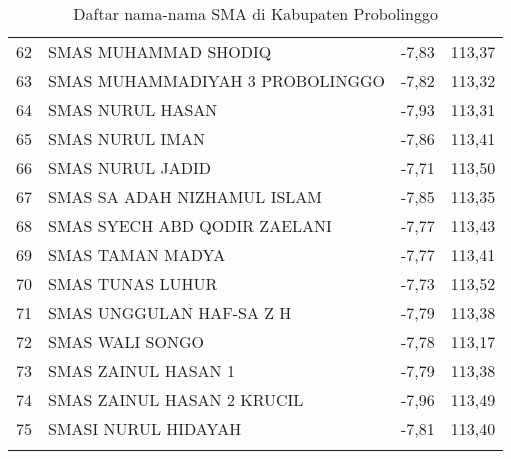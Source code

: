 {\begin{longtable}[c]{clll}
62 & SMAS   MUHAMMAD SHODIQ                & -7,83 & 113,37 \\
\rowcolor[HTML]{D9E1F2} 
63 & SMAS MUHAMMADIYAH 3 PROBOLINGGO       & -7,82 & 113,32 \\
64 & SMAS   NURUL HASAN                    & -7,93 & 113,31 \\
\rowcolor[HTML]{D9E1F2} 
65 & SMAS NURUL IMAN                       & -7,86 & 113,41 \\
66 & SMAS   NURUL JADID                    & -7,71 & 113,50 \\
\rowcolor[HTML]{D9E1F2} 
67 & SMAS SA ADAH NIZHAMUL ISLAM           & -7,85 & 113,35 \\
68 & SMAS   SYECH ABD QODIR ZAELANI        & -7,77 & 113,43 \\
\rowcolor[HTML]{D9E1F2} 
69 & SMAS TAMAN MADYA                      & -7,77 & 113,41 \\
70 & SMAS   TUNAS LUHUR                    & -7,73 & 113,52 \\
\rowcolor[HTML]{D9E1F2} 
71 & SMAS UNGGULAN HAF-SA Z H              & -7,79 & 113,38 \\
72 & SMAS   WALI SONGO                     & -7,78 & 113,17 \\
\rowcolor[HTML]{D9E1F2} 
73 & SMAS ZAINUL HASAN 1                   & -7,79 & 113,38 \\
74 & SMAS   ZAINUL HASAN 2 KRUCIL          & -7,96 & 113,49 \\
\rowcolor[HTML]{D9E1F2} 
75 & SMASI NURUL HIDAYAH                   & -7,81 & 113,40 \\ \cline{2-4} 
\caption{Daftar nama-nama SMA di Kabupaten Probolinggo}
\end{longtable}
}